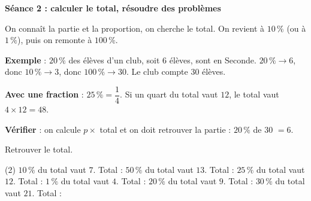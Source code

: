 \documentclass[a4paper,11pt,fleqn]{article}
\newcommand{\pt}[1][1.6cm]{\makebox[#1]{\dotfill}}
\newcommand{\seance}[1]{{\large\bfseries\textcolor{couleur_theme}{#1}}\par\smallskip}
\begin{document}


\seance{Séance 2 : calculer le total, résoudre des problèmes}

\begin{tcolorbox}[colback=white, colframe=couleur_theme, title=\textbf{Rappel : calculer le total connaissant une partie}, fonttitle=\bfseries]
On connaît la partie et la proportion, on cherche le total. On revient à $10\,\%$ (ou à $1\,\%$), puis on remonte à $100\,\%$.

\smallskip
\textbf{Exemple} : $20\,\%$ des élèves d'un club, soit $6$ élèves, sont en Seconde. \quad
$20\,\% \to 6$, \quad donc $10\,\% \to 3$, \quad donc $100\,\% \to 30$. \quad Le club compte $30$ élèves.

\smallskip
\textbf{Avec une fraction} : $25\,\% = \dfrac{1}{4}$. Si un quart du total vaut $12$, le total vaut $4 \times 12 = 48$.

\smallskip
\textbf{Vérifier} : on calcule $p \times$ total et on doit retrouver la partie : \quad $20\,\%$ de $30$ \quad $= 6$.
\end{tcolorbox}

\begin{EXO}{}{}
Retrouver le total.

\begin{tasks}[label=\textbf{\alph*.}, item-indent=2em, after-item-skip=0.9em](2)
	\task $10\,\%$ du total vaut $7$. \quad Total : \pt[2.5cm]
	\task $50\,\%$ du total vaut $13$. \quad Total : \pt[2.5cm]
	\task $25\,\%$ du total vaut $12$. \quad Total : \pt[2.5cm]
	\task $1\,\%$ du total vaut $4$. \quad Total : \pt[2.5cm]
	\task $20\,\%$ du total vaut $9$. \quad Total : \pt[2.5cm]
	\task $30\,\%$ du total vaut $21$. \quad Total : \pt[2.5cm]
\end{tasks}
\end{EXO}
\end{document}
